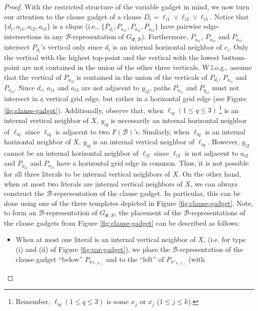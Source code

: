 \documentclass[11pt,3p,times]{elsarticle}
\newenvironment{myproof}{\begin{proof}}{\end{proof}}
\begin{document}
\begin{myproof}
With the restricted structure of the variable gadget in mind, we
now turn our attention to the clause gadget of a clause $D_i =
\ell_{i1} \vee \ell_{i2} \vee \ell_{i3}$. Notice that $\{d_i, a_{i1}, a_{i2}, a_{i3}\}$ is
a clique (i.e., $\{P_{d_i},P_{a_{i1}},P_{a_{i2}},P_{a_{i3}}\}$ have pairwise edge-intersections
in any $\mathcal{B}$-representation of $G_{\Phi,\mathcal{B}}$).
Furthermore, $P_{a_{i1}}$, $P_{a_{i2}}$ and $P_{a_{i3}}$ intersect
$P_{d_i}$'s vertical only since $d_i$ is an internal horizontal
neighbor of $c_i$. Only the vertical with the highest top-point
and the vertical with the lowest bottom-point are not contained
in the union of the other three verticals.  W.l.o.g., assume that the
vertical of $P_{a_{i2}}$ is contained in the union of the verticals of
$P_{d_i}$, $P_{a_{i1}}$ and $P_{a_{i3}}$. Since $d_i$, $a_{i1}$
and $a_{i3}$ are not adjacent to $y_{i2}$, paths $P_{a_{i2}}$ and
$P_{y_{i2}}$ must not intersect in a vertical grid edge, but rather in a
horizontal grid edge (see Figure \ref{fig:clause-gadget}).
Additionally, observe that, when
$\ell_{iq} (1 \leq q \leq 3)~$\footnote{Remember, $\ell_{iq} (1 \leq q \leq 3)$ is some $x_j$ or
$\overline{x_j}$ ($1\leq j \leq k$).} is an internal vertical
neighbor of $X$, $y_{iq}$ is necessarily an internal horizontal
neighbor of $\ell_{iq}$ since $\ell_{iq}$ is adjacent to two $F(\mathcal{B})$'s.
Similarly, when $\ell_{iq}$ is an internal horizontal neighbor of
$X$, $y_{iq}$ is an internal vertical neighbor of $\ell_{iq}$. However,
$y_{i2}$ cannot be an internal horizontal neighbor of $\ell_{i2}$ since
$\ell_{i2}$ is not adjacent to $a_{i2}$ and $P_{y_{i2}}$ and $P_{a_{i2}}$ have
a horizontal grid edge in common. Thus, it is not possible for all
three literals to be internal vertical neighbors of $X$. On the
other hand, when at most two literals are internal vertical
neighbors of $X$, we can always construct the
$\mathcal{B}$-representation of the clause gadget. In particular, this
can be done using one of the three templates depicted in Figure
\ref{fig:clause-gadget}. Note, to form an $\mathcal{B}$-representation
of $G_{\Phi,\mathcal{B}}$, the placement of the $\mathcal{B}$-representations of the
clause gadgets from Figure \ref{fig:clause-gadget} can be described as
follows:
\begin{itemize}
\item When at most one literal is an
internal vertical neighbor of $X$, (i.e. for type (i) and (ii) of
Figure \ref{fig:var-gadget}), we place the
$\mathcal{B}$-representation of the clause gadget ``below''
$P_{w_{\pi(k)}}$ and to the ``left'' of $P_{w'_{\pi(1)}}$ (with

\end{itemize}
\end{myproof}
\end{document}
